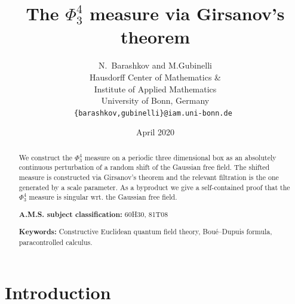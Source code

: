 \documentclass[11pt]{article}
\newcommand{\tmaffiliation}[1]{\\ #1}
\newcommand{\tmsep}{, }
\newcommand{\tmkeywords}{\textbf{Keywords:} }
\newcommand{\tmmsc}{\textbf{A.M.S. subject classification:} }
\begin{document}
\title{The $\Phi^4_3$ measure via Girsanov's theorem}

\author{
  N.~Barashkov and M.Gubinelli
  \tmaffiliation{Hausdorff Center of Mathematics \&\\
  Institute of Applied Mathematics\\
  University of Bonn, Germany}\\
  \tt{\{barashkov,gubinelli\}@iam.uni-bonn.de}
}
\date{April 2020}

\maketitle

\begin{abstract}
  We construct the $\Phi^4_3$ measure on a periodic three dimensional box as
  an absolutely continuous perturbation of a random shift of the Gaussian free
  field. The shifted measure is constructed via Girsanov's theorem and the
  relevant filtration is the one generated by a scale parameter. As a
  byproduct we give a self-contained proof that the $\Phi^4_3$ measure is
  singular wrt. the Gaussian free field.\\[1em]
  {\footnotesize 
\noindent\tmmsc{60H30}{\tmsep}{81T08}

\noindent\tmkeywords{Constructive Euclidean quantum field theory, Bou{\'e}--Dupuis
formula, paracontrolled calculus.}}

\end{abstract}

\section{Introduction}
\end{document}
